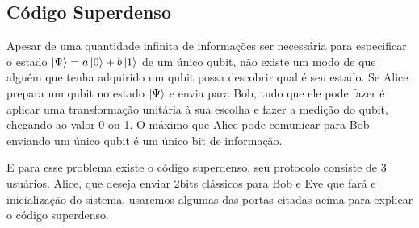\documentclass[a4paper, 12pt, oneside]{book}
\begin{document}
\subsection{Código Superdenso}

Apesar de uma quantidade infinita de informações ser necessária para especificar o estado $\ket{\Psi}=a\ket{0}+b\ket{1}$ de um único qubit, não existe um modo de que alguém que tenha adquirido um qubit possa descobrir qual é seu estado. Se Alice prepara um qubit no estado $\ket{\Psi}$ e envia para Bob, tudo que ele pode fazer é aplicar uma transformação unitária à sua escolha e fazer a medição do qubit, chegando ao valor 0 ou 1. O máximo que Alice pode comunicar para Bob enviando um único qubit é um único bit de informação.

E para esse problema existe o código superdenso, seu protocolo consiste de 3 usuários. Alice, que deseja enviar 2bits clássicos para Bob e Eve que fará e inicialização do sistema, usaremos algumas das portas citadas acima para explicar o código superdenso.
\end{document}
